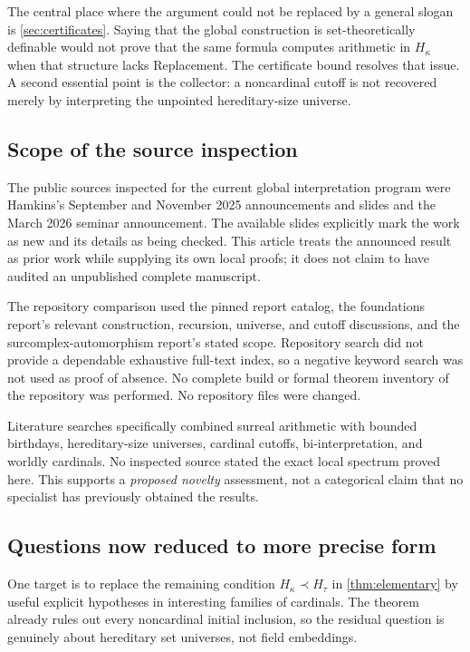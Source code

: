 \documentclass[11pt,letterpaper]{article}
\theoremstyle{definition}
\theoremstyle{remark}
\begin{document}
The central place where the argument could not be replaced by a general
slogan is \cref{sec:certificates}. Saying that the global construction is
set-theoretically definable would not prove that the same formula computes
arithmetic in $H_\kappa$ when that structure lacks Replacement. The
certificate bound resolves that issue. A second essential point is the
collector: a noncardinal cutoff is not recovered merely by interpreting the
unpointed hereditary-size universe.

\subsection{Scope of the source inspection}

The public sources inspected for the current global interpretation program
were Hamkins's September and November 2025 announcements and slides and the
March 2026 seminar announcement. The available slides explicitly mark the
work as new and its details as being checked. This article treats the
announced result as prior work while supplying its own local proofs; it does
not claim to have audited an unpublished complete manuscript.

The repository comparison used the pinned report catalog, the foundations
report's relevant construction, recursion, universe, and cutoff discussions,
and the surcomplex-automorphism report's stated scope. Repository search did
not provide a dependable exhaustive full-text index, so a negative keyword
search was not used as proof of absence. No complete build or formal theorem
inventory of the repository was performed. No repository files were changed.

Literature searches specifically combined surreal arithmetic with bounded
birthdays, hereditary-size universes, cardinal cutoffs, bi-interpretation,
and worldly cardinals. No inspected source stated the exact local spectrum
proved here. This supports a \emph{proposed novelty} assessment, not a
categorical claim that no specialist has previously obtained the results.

\subsection{Questions now reduced to more precise form}

One target is to replace the remaining condition $H_\kappa\prec H_\tau$
in \cref{thm:elementary} by useful explicit hypotheses in interesting
families of cardinals. The theorem already rules out every noncardinal
initial inclusion, so the residual question is genuinely about hereditary
set universes, not field embeddings.
\end{document}
